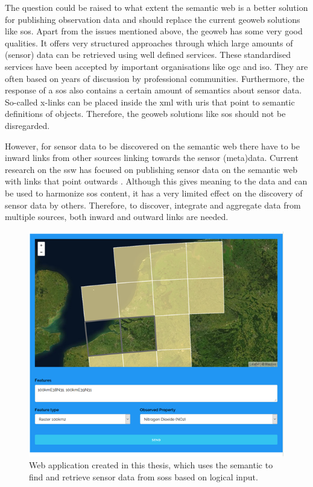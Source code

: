 The question could be raised to what extent the semantic web is a better solution for publishing observation data and should replace the current geoweb solutions like \ac{sos}. Apart from the issues mentioned above, the geoweb has some very good qualities. It offers very structured approaches through which large amounts of (sensor) data can be retrieved using well defined services. These standardised services have been accepted by important organisations like \ac{ogc} and \ac{iso}. They are often based on years of discussion by professional communities. Furthermore, the response of a \ac{sos} also contains a certain amount of semantics about sensor data. So-called x-links can be placed inside the \ac{xml} with \ac{uri}s that point to semantic definitions of objects. Therefore, the geoweb solutions like \ac{sos} should not be disregarded.

However, for sensor data to be discovered on the semantic web there have to be inward links from other sources linking towards the sensor (meta)data. Current research on the \ac{ssw} has focused on publishing sensor data on the semantic web with links that point outwards \citep{SSW:Janowicz, SSW:Pschorr, SSW:Atkinson}. Although this gives meaning to the data and can be used to harmonize \ac{sos} content, it has a very limited effect on the discovery of sensor data by others. Therefore, to discover, integrate and aggregate data from multiple sources, both inward and outward links are needed.  


\begin{figure}
	\centering
	\includegraphics[width=0.8\linewidth]{figs/interface1.PNG}
	\caption{Web application created in this thesis, which uses the semantic to find and retrieve sensor data from \aclp*{sos} based on logical input.}
	\label{fig:logical}
\end{figure}

